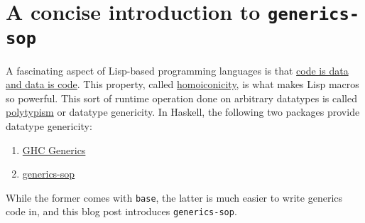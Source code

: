 \hypertarget{a-concise-introduction-to-generics-sop}{%
\section{\texorpdfstring{A concise introduction to
\texttt{generics-sop}}{A concise introduction to generics-sop}}\label{a-concise-introduction-to-generics-sop}}

A fascinating aspect of Lisp-based programming languages is that
\href{https://en.wikipedia.org/wiki/Code_as_data}{code is data and data
is code}. This property, called
\href{https://en.wikipedia.org/wiki/Homoiconicity}{homoiconicity}, is
what makes Lisp macros so powerful. This sort of runtime operation done
on arbitrary datatypes is called
\href{https://en.wikipedia.org/wiki/Polymorphism_(computer_science)\#Polytypism}{polytypism}
or datatype genericity. In Haskell, the following two packages provide
datatype genericity:

\begin{enumerate}
\def\labelenumi{\arabic{enumi}.}
\tightlist
\item
  \href{https://hackage.haskell.org/package/base-4.16.0.0/docs/GHC-Generics.html}{GHC
  Generics}
\item
  \href{https://hackage.haskell.org/package/generics-sop}{generics-sop}
\end{enumerate}

While the former comes with \texttt{base}, the latter is much easier to
write generics code in, and this blog post introduces
\texttt{generics-sop}.

